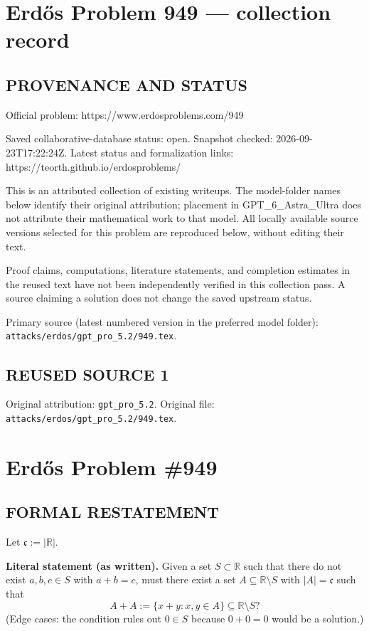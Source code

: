 \section*{Erd\H{o}s Problem 949 --- collection record}

\subsection*{PROVENANCE AND STATUS}
Official problem: https://www.erdosproblems.com/949

Saved collaborative-database status: open.
Snapshot checked: 2026-09-23T17:22:24Z.
Latest status and formalization links: https://teorth.github.io/erdosproblems/

This is an attributed collection of existing writeups. The model-folder names below identify their original attribution; placement in GPT\_6\_Astra\_Ultra does not attribute their mathematical work to that model. All locally available source versions selected for this problem are reproduced below, without editing their text.

Proof claims, computations, literature statements, and completion estimates in the reused text have not been independently verified in this collection pass. A source claiming a solution does not change the saved upstream status.

Primary source (latest numbered version in the preferred model folder): \texttt{attacks/erdos/gpt\_pro\_5.2/949.tex}.

\subsection*{REUSED SOURCE 1}
Original attribution: \texttt{gpt\_pro\_5.2}.
Original file: \texttt{attacks/erdos/gpt\_pro\_5.2/949.tex}.


\section*{Erd\H{o}s Problem \#949}

\subsection*{FORMAL RESTATEMENT}
Let $\mathfrak c:=|\mathbb R|$.

\medskip
\noindent\textbf{Literal statement (as written).}
Given a set $S\subset\mathbb R$ such that there do not exist $a,b,c\in S$ with $a+b=c$, must there exist a set $A\subseteq\mathbb R\setminus S$ with $|A|=\mathfrak c$ such that
\[
A+A:=\{x+y:x,y\in A\}\subseteq \mathbb R\setminus S?
\]
(Edge cases: the condition rules out $0\in S$ because $0+0=0$ would be a solution.)

